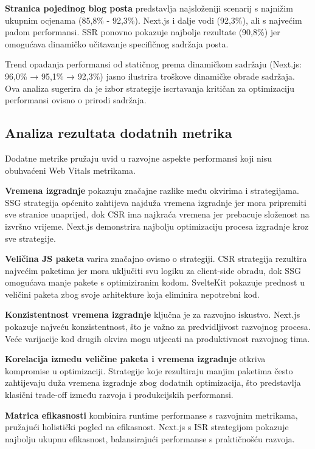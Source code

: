 \textbf{Stranica pojedinog blog posta} predstavlja najsloženiji scenarij s najnižim ukupnim ocjenama (85,8\% - 92,3\%). Next.js i dalje vodi (92,3\%), ali s najvećim padom performansi. SSR ponovno pokazuje najbolje rezultate (90,8\%) jer omogućava dinamičko učitavanje specifičnog sadržaja posta.

Trend opadanja performansi od statičnog prema dinamičkom sadržaju (Next.js: 96,0\% → 95,1\% → 92,3\%) jasno ilustrira troškove dinamičke obrade sadržaja. Ova analiza sugerira da je izbor strategije iscrtavanja kritičan za optimizaciju performansi ovisno o prirodi sadržaja.

\subsection{Analiza rezultata dodatnih metrika}

Dodatne metrike pružaju uvid u razvojne aspekte performansi koji nisu obuhvaćeni Web Vitals metrikama.

\textbf{Vremena izgradnje} pokazuju značajne razlike među okvirima i strategijama. SSG strategija općenito zahtijeva najduža vremena izgradnje jer mora pripremiti sve stranice unaprijed, dok CSR ima najkraća vremena jer prebacuje složenost na izvršno vrijeme. Next.js demonstrira najbolju optimizaciju procesa izgradnje kroz sve strategije.

\textbf{Veličina JS paketa} varira značajno ovisno o strategiji. CSR strategija rezultira najvećim paketima jer mora uključiti svu logiku za client-side obradu, dok SSG omogućava manje pakete s optimiziranim kodom. SvelteKit pokazuje prednost u veličini paketa zbog svoje arhitekture koja eliminira nepotrebni kod.

\textbf{Konzistentnost vremena izgradnje} ključna je za razvojno iskustvo. Next.js pokazuje najveću konzistentnost, što je važno za predvidljivost razvojnog procesa. Veće varijacije kod drugih okvira mogu utjecati na produktivnost razvojnog tima.

\textbf{Korelacija između veličine paketa i vremena izgradnje} otkriva kompromise u optimizaciji. Strategije koje rezultiraju manjim paketima često zahtijevaju duža vremena izgradnje zbog dodatnih optimizacija, što predstavlja klasični trade-off između razvoja i produkcijskih performansi.

\textbf{Matrica efikasnosti} kombinira runtime performanse s razvojnim metrikama, pružajući holistički pogled na efikasnost. Next.js s ISR strategijom pokazuje najbolju ukupnu efikasnost, balansirajući performanse s praktičnošću razvoja.


